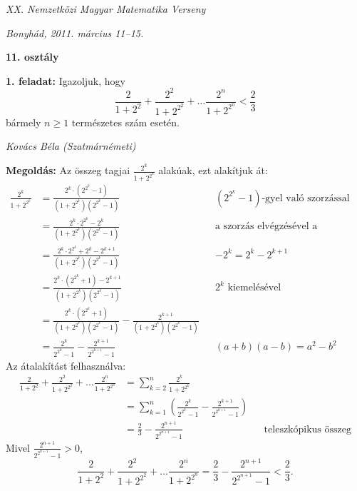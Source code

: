 \documentclass[a4paper,10pt]{article}
\newcommand{\ki}[2]{\hfill {\it #1 (#2)}\medskip}
\begin{document}
\begin{center} \Large {\em XX. Nemzetközi Magyar Matematika Verseny} \end{center}
\begin{center} \large{\em Bonyhád, 2011. március 11--15.} \end{center}
\smallskip
\begin{center} \large{\bf 11. osztály} \end{center}
\bigskip 

{\bf 1. feladat: }  Igazoljuk, hogy \[\frac{2}{1+2^2}+\frac{2^2}{1+2^{2^2}}+\ldots\frac{2^n}{1+2^{2^n}}<\frac23\] bármely $n\ge1$ természetes szám esetén.

\ki{Kovács Béla}{Szatmárnémeti}\medskip

{\bf Megoldás: } Az összeg tagjai $\frac{2^k}{1+2^{2^k}}$ alakúak, ezt alakítjuk át:
\begin{align*}
\frac{2^k}{1+2^{2^k}} &= \frac{2^k \cdot \left(2^{2^k}-1\right)}{\left(1+2^{2^k}\right)\left(2^{2^k}-1\right)} &&\text{$\left(2^{2^k}-1\right)$-gyel való szorzással}\\
&= \frac{2^k \cdot 2^{2^k}-2^k}{\left(1+2^{2^k}\right)\left(2^{2^k}-1\right)} &&\text{a szorzás elvégzésével a számlálóban} \\
&= \frac{2^k \cdot 2^{2^k}+2^k-2^{k+1}}{\left(1+2^{2^k}\right)\left(2^{2^k}-1\right)} &&\text{$-2^k=2^k-2^{k+1}$}\\
&= \frac{2^k \cdot \left(2^{2^k}+1\right)-2^{k+1}}{\left(1+2^{2^k}\right)\left(2^{2^k}-1\right)} &&\text{$2^k$ kiemelésével}\\
&= \frac{2^k \cdot \left(2^{2^k}+1\right)}{\left(1+2^{2^k}\right)\left(2^{2^k}-1\right)} - \frac{2^{k+1}}{\left(1+2^{2^k}\right)\left(2^{2^k}-1\right)} \\
&= \frac{2^k}{2^{2^k}-1} - \frac{2^{k+1}}{2^{2^{k+1}}-1} &&\text{$(a+b)(a-b)=a^2-b^2$}
\end{align*}
Az átalakítást felhasználva:
\begin{align*}
\frac{2}{1+2^2}+\frac{2^2}{1+2^{2^2}}+\ldots\frac{2^n}{1+2^{2^n}}&=\sum_{k=2}^n \frac{2^k}{1+2^{2^k}} \\
&= \sum_{k=1}^n \left(\frac{2^k}{2^{2^k}-1} - \frac{2^{k+1}}{2^{2^{k+1}}-1}\right) \\
&= \frac23 - \frac{2^{n+1}}{2^{2^{n+1}}-1} &&\text{teleszkópikus összeg}
\end{align*}
Mivel $\frac{2^{n+1}}{2^{2^{n+1}}-1}>0$, 
\[\frac{2}{1+2^2}+\frac{2^2}{1+2^{2^2}}+\ldots\frac{2^n}{1+2^{2^n}}=\frac23 - \frac{2^{n+1}}{2^{2^{n+1}}-1}<\frac23.\]
\end{document}
